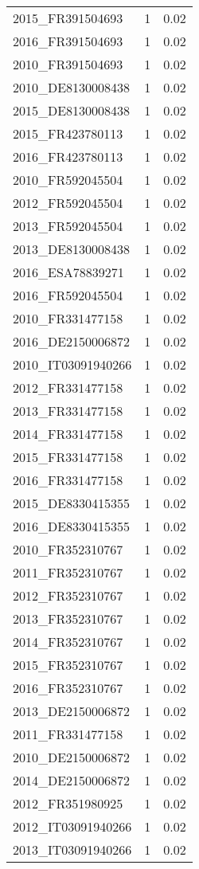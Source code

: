 \begin{table*}[htbp]
\begin{tabular}{lrr}
2015_FR391504693 & 1 & 0.02 \\
2016_FR391504693 & 1 & 0.02 \\
2010_FR391504693 & 1 & 0.02 \\
2010_DE8130008438 & 1 & 0.02 \\
2015_DE8130008438 & 1 & 0.02 \\
2015_FR423780113 & 1 & 0.02 \\
2016_FR423780113 & 1 & 0.02 \\
2010_FR592045504 & 1 & 0.02 \\
2012_FR592045504 & 1 & 0.02 \\
2013_FR592045504 & 1 & 0.02 \\
2013_DE8130008438 & 1 & 0.02 \\
2016_ESA78839271 & 1 & 0.02 \\
2016_FR592045504 & 1 & 0.02 \\
2010_FR331477158 & 1 & 0.02 \\
2016_DE2150006872 & 1 & 0.02 \\
2010_IT03091940266 & 1 & 0.02 \\
2012_FR331477158 & 1 & 0.02 \\
2013_FR331477158 & 1 & 0.02 \\
2014_FR331477158 & 1 & 0.02 \\
2015_FR331477158 & 1 & 0.02 \\
2016_FR331477158 & 1 & 0.02 \\
2015_DE8330415355 & 1 & 0.02 \\
2016_DE8330415355 & 1 & 0.02 \\
2010_FR352310767 & 1 & 0.02 \\
2011_FR352310767 & 1 & 0.02 \\
2012_FR352310767 & 1 & 0.02 \\
2013_FR352310767 & 1 & 0.02 \\
2014_FR352310767 & 1 & 0.02 \\
2015_FR352310767 & 1 & 0.02 \\
2016_FR352310767 & 1 & 0.02 \\
2013_DE2150006872 & 1 & 0.02 \\
2011_FR331477158 & 1 & 0.02 \\
2010_DE2150006872 & 1 & 0.02 \\
2014_DE2150006872 & 1 & 0.02 \\
2012_FR351980925 & 1 & 0.02 \\
2012_IT03091940266 & 1 & 0.02 \\
2013_IT03091940266 & 1 & 0.02 \\

\end{tabular}
\end{table*}
